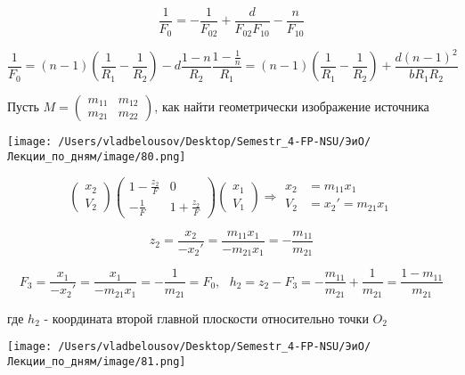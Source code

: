 \documentclass[12pt, a4paper]{report}
\begin{document}
\[ \frac{1}{F_0 } = - \frac{1}{F_{02} }+ \frac{d}{F_{02} F_{10} } - \frac{n}{F_{10}}     \] 

\[ \frac{1}{F_0 } = (n -1 ) \left(  \frac{1}{R_1 } - \frac{1}{R_2 }    \right)  - d \frac{ 1 - n }{R_2 } \frac{1 - \frac{1}{n } }{R_1  } = (n -1 ) \left( \frac{1}{R_1 } - \frac{1}{R_2 }      \right) + \frac{d (n-1 ) ^2 }{b R_1 R_2 }     \] 

Пусть \( M = \begin{pmatrix}
m_{11}   & m_{12}\\
m_{21} & m_{22}
\end{pmatrix} \), как найти геометрически изображение источника 

\begin{center}
    \texttt{[image: /Users/vladbelousov/Desktop/Semestr\_4-FP-NSU/ЭиО/Лекции\_по\_дням/image/80.png]}
\end{center} 

\[ \begin{pmatrix}
    x_2\\
    V_2 
    \end{pmatrix}
    \begin{pmatrix}
        1- \frac{z_2}{F }   & 0\\
        - \frac{1}{F }  & 1+ \frac{z_2}{F}  
    \end{pmatrix}
    \begin{pmatrix}
        x_1 \\
        V_1
    \end{pmatrix}
\Rightarrow \begin{aligned}
x_2 &= m_{11} x_1 \\
V_2 &= x_2 ' = m_{21} x_1 
\end{aligned}    
\] 

\[ z_2 = \frac{x_2}{- x_2 ' } = \frac{m_{11} x_1 }{- m_{21} x_1 }= - \frac{m_{11}}{m_{21}}    \] 

\[ F_3 = \frac{x_1}{- x_2 ' } = \frac{x_1}{ - m_{21} x_1 } = - \frac{1}{m_{21}} = F_0 ,\text{ } h_2 = z_2 - F_3 = - \frac{m_{11}}{m_{21} } + \frac{1}{m_{21} } = \frac{1 - m_{11} }{m_{21}}       \] 

где \( h_2  \) - координата второй главной плоскости относительно точки \( O_2  \) 

\begin{center}
    \texttt{[image: /Users/vladbelousov/Desktop/Semestr\_4-FP-NSU/ЭиО/Лекции\_по\_дням/image/81.png]}
\end{center} 
\end{document}
